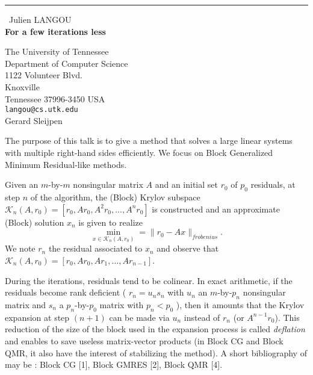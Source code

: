 \documentclass{report}
\begin{document}
\begin{center}
\rule{6in}{1pt} \
{\large Julien LANGOU \\
{\bf For a few iterations less}}

The University of Tennessee \\ Department of Computer Science \\ 1122 Volunteer Blvd. \\ Knoxville \\ Tennessee 37996-3450 USA
\\
{\tt langou@cs.utk.edu}\\
Gerard Sleijpen\end{center}

The purpose of this talk is to give a method that solves a large linear
systems with multiple right-hand
sides efficiently. We focus on Block Generalized Minimum Residual-like methods.

Given an $m$-by-$m$ nonsingular matrix $A$ and an initial set $r_0$ of $p_0$ residuals,
at step $n$ of the algorithm,
the (Block) Krylov subspace $\mathcal{K}_n(A,r_0) = [
r_0,Ar_0,A^2r_0,...,A^nr_0 ]$ is constructed and
an approximate (Block) solution $x_n$ is given to realize
$$\min_{x\in\mathcal{K}_n(A,r_0)} = \| r_0 - A x \|_{frobenius}. $$
We note $r_n$ the residual associated to $x_n$ and observe that
$\mathcal{K}_n(A,r_0) = [ r_0,Ar_0,Ar_1,\ldots,Ar_{n-1} ]$.

During the iterations, residuals tend to be colinear. In exact
arithmetic, if the residuals
become rank deficient ( $ r_n = u_n s_n $ with $u_n$ an $m$-by-$p_n$ nonsingular matrix
and $s_n$ a $p_n$-by-$p_0$ matrix with $ p_n < p_0 $ ), then it amounts
that the Krylov expansion at step
$(n+1)$ can be made via $u_n$ instead of $r_n$ (or $A^{n-1}r_0$).
This reduction of the size of the block used in the expansion process
is called \textit{deflation} and enables to save useless matrix-vector products
(in Block CG and Block QMR, it also have the interest of stabilizing the method).
A short bibliography of may be : Block CG [1], Block GMRES [2], Block QMR [4].
\end{document}
